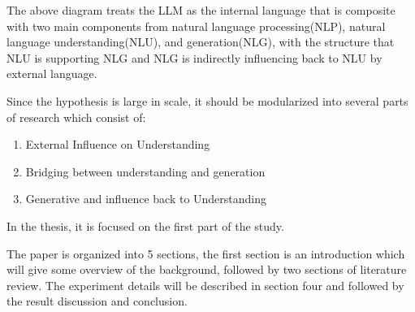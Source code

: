 \documentclass[12pt]{article}
\begin{document}
The above diagram treats the LLM as the internal language that is composite with two main components from natural language processing(NLP), natural language understanding(NLU), and generation(NLG), with the structure that NLU is supporting NLG and NLG is indirectly influencing back to NLU by external language. 

Since the hypothesis is large in scale, it should be modularized into several parts of research which consist of:
\begin{enumerate}
    \item External Influence on Understanding
    \item Bridging between understanding and generation
    \item Generative and influence back to Understanding
\end{enumerate}
In the thesis, it is focused on the first part of the study.

The paper is organized into 5 sections, the first section is an introduction which will give some overview of the background, followed by two sections of literature review. The experiment details will be described in section four and followed by the result discussion and conclusion.
\end{document}
